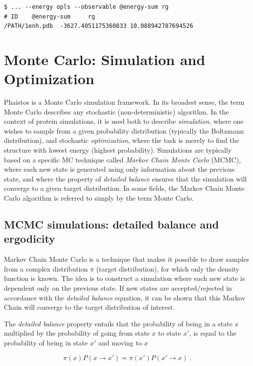 \documentclass[11pt,a4paper,twoside]{book}
\begin{document}
\begin{verbatim}
$ ... --energy opls --observable @energy-sum rg
# ID    @energy-sum     rg      
/PATH/1enh.pdb  -3627.4051175360833 10.088942787694526
\end{verbatim}

\chapter[Simulation and Optimization]{Monte Carlo: Simulation and Optimization}
\label{sec:simulation-types}

Phaistos is a Monte Carlo simulation framework. In its broadest sense,
the term Monte Carlo describes any stochastic (non-deterministic)
algorithm. In the context of protein simulations, it is used both to
describe \emph{simulation}, where one wishes to sample from a given
probability distribution (typically the Boltzmann distribution), and
stochastic \emph{optimization}, where the task is merely to find the
structure with lowest energy (highest probability). Simulations are
typically based on a specific MC technique called \emph{Markov Chain
  Monte Carlo} (MCMC), where each new state is generated using only
information about the previous state, and where the property of
\emph{detailed balance} ensures that the simulation will converge to a
given target distribution. In some fields, the Markov Chain Monte Carlo
algorithm is referred to simply by the term Monte Carlo.


\section{MCMC simulations: detailed balance and ergodicity}
\label{sec:detailed-balance}

Markov Chain Monte Carlo is a technique that makes it possible to draw
samples from a complex distribution $\pi$ (target distribution), for
which only the density function is known. The idea is to construct a
simulation where each new state is dependent only on the previous
state. If new states are accepted/rejected in accordance with the
\emph{detailed balance} equation, it can be shown that this Markov
Chain will converge to the target distribution of interest.

The \emph{detailed balance} property entails that the probability of
being in a state $x$ multiplied by the probability of going from state
$x$ to state $x'$, is equal to the probability of being in state $x'$
and moving to $x$

\begin{equation}
\pi(x)P(x \rightarrow x') = \pi(x')P(x' \rightarrow x) \ .
\label{eq:monte-carlo-1}
\end{equation}
\end{document}
